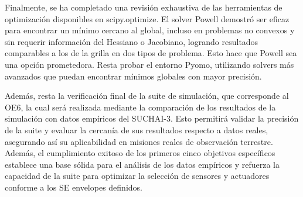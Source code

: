 Finalmente, se ha completado una revisión exhaustiva de las herramientas de optimización disponibles en scipy.optimize. El solver Powell demostró ser eficaz para encontrar un mínimo cercano al global, incluso en problemas no convexos y sin requerir información del Hessiano o Jacobiano, logrando resultados comparables a los de la grilla en dos tipos de problema. Esto hace que Powell sea una opción prometedora. Resta probar el entorno Pyomo, utilizando solvers más avanzados que puedan encontrar mínimos globales con mayor precisión.

Además, resta la verificación final de la suite de simulación, que corresponde al OE6, la cual será realizada mediante la comparación de los resultados de la simulación con datos empíricos del SUCHAI-3. Esto permitirá validar la precisión de la suite y evaluar la cercanía de sus resultados respecto a datos reales, asegurando así su aplicabilidad en misiones reales de observación terrestre. Además, el cumplimiento exitoso de los primeros cinco objetivos específicos establece una base sólida para el análisis de los datos empíricos y refuerza la capacidad de la suite para optimizar la selección de sensores y actuadores conforme a los SE envelopes definidos.